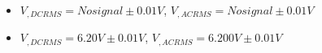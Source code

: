 \begin{itemize}
     \item $V_{, DCRMS}=No signal\pm 0.01\unit{V}$, $V_{, ACRMS}=No signal\pm 0.01\unit{V}$ 
     \item $V_{, DCRMS}=6.20V\pm 0.01\unit{V}$, $V_{, ACRMS}=6.200V\pm 0.01\unit{V}$\\
\end{itemize}